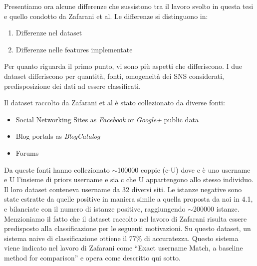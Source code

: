 Presentiamo ora alcune differenze che sussistono tra il lavoro svolto in questa tesi e quello condotto da Zafarani et al. Le differenze si distinguono in:

\begin{enumerate}
	\item Differenze nel dataset
	\item Differenze nelle features implementate
\end{enumerate}


Per quanto riguarda il primo punto, vi sono più aspetti che differiscono. I due dataset differiscono per quantità, fonti, omogeneità dei SNS considerati, predisposizione dei dati ad essere classificati.

Il dataset raccolto da Zafarani et al è stato collezionato da diverse fonti\cite{zafarani13}:
\begin{itemize}
	\item Social Networking Sites as \textit{Facebook} or \textit{Google+} public data
	\item Blog portals as \textit{BlogCatalog}
	\item Forums
\end{itemize}

Da queste fonti hanno collezionato $\sim$100000 coppie (c-U) dove c è uno username e U l'insieme di priors username e sia c che U appartengono allo stesso individuo. Il loro dataset conteneva username da 32 diversi siti. Le istanze negative sono state estratte da quelle positive in maniera simile a quella proposta da noi in 4.1, e bilanciate con il numero di istanze positive, raggiungendo $\sim$200000 istanze. Menzioniamo il fatto che il dataset raccolto nel lavoro di Zafarani risulta essere predisposto alla classificazione per le seguenti motivazioni. Su questo dataset, un sistema naive di classificazione ottiene il 77\% di accuratezza. Questo sistema viene indicato nel lavoro di Zafarani come “Exact username Match, a baseline method for comparison” e opera come descritto qui sotto.
